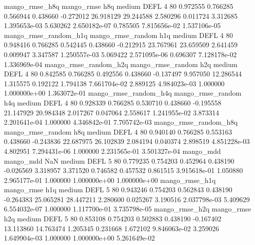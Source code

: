        mango_rmse_h8q        mango_rmse                  h8q     medium     DEFL                 4 80  0.972555       0.766285 0.566944       0.438660   -0.272012     26.918129     29.244588     2.580296       0.011724  3.312685 1.395653e-03     5.630262   2.650182e-07            0.785505    7.815656e-02        1.537106e-05
mango_rmse_random_h1q mango_rmse_random                  h1q     medium     DEFL                 4 80  0.948416       0.766285 0.542445       0.438660   -0.212915     23.767961     23.659509     2.641459       0.009947  3.347587 1.250557e-03     5.069422   2.571095e-06            0.696307    7.128178e-02        1.336969e-04
mango_rmse_random_h2q mango_rmse_random                  h2q     medium     DEFL                 4 80  0.842585       0.766285 0.492556       0.438660   -0.137497      9.957050     12.286544     1.315575       0.192122  1.794138 7.661704e-02     2.889125   4.984023e-03            1.000000    1.000000e+00        1.363072e-01
mango_rmse_random_h4q mango_rmse_random                  h4q     medium     DEFL                 4 80  0.928339       0.766285 0.530710       0.438660   -0.195558     21.147929     20.984348     2.017267       0.047064  2.558617 1.241955e-02     3.873314   2.201641e-04            1.000000    4.346842e-01        7.705742e-03
mango_rmse_random_h8q mango_rmse_random                  h8q     medium     DEFL                 4 80  0.940140       0.766285 0.553163       0.438660   -0.243836     22.687975     26.102839     2.084194       0.040374  2.898519 4.851228e-03     4.802951   7.294431e-06            1.000000    2.231565e-01        3.501327e-04
            mango_mdd         mango_mdd                  NaN     medium     DEFL                 5 80  0.779235       0.754203 0.452964       0.438190   -0.026569      3.318957      3.371520     0.746582       0.457532  0.861515 3.915618e-01     1.050880   2.965177e-01            1.000000    1.000000e+00        1.000000e+00
       mango_rmse_h1q        mango_rmse                  h1q     medium     DEFL                 5 80  0.943246       0.754203 0.562843       0.438190   -0.264383     25.065281     28.447211     2.280600       0.025267  3.190516 2.037798e-03     5.409629   6.554032e-07            1.000000    1.117700e-01        3.735798e-05
       mango_rmse_h2q        mango_rmse                  h2q     medium     DEFL                 5 80  0.853108       0.754203 0.502883       0.438190   -0.167402     13.113860     14.763474     1.205345       0.231668  1.672102 9.846063e-02     3.259026   1.649904e-03            1.000000    1.000000e+00        5.261649e-02
